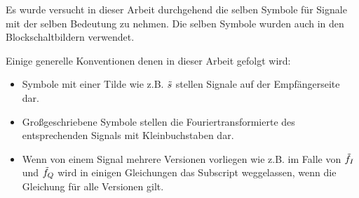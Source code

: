 Es wurde versucht in dieser Arbeit durchgehend die selben Symbole für Signale mit der selben Bedeutung zu nehmen. Die selben Symbole wurden auch in den Blockschaltbildern verwendet.

Einige generelle Konventionen denen in dieser Arbeit gefolgt wird: 
\begin{itemize}
\item Symbole mit einer Tilde wie z.B. $\tilde{s}$ stellen Signale auf der Empfängerseite dar. 
\item Großgeschriebene Symbole stellen die Fouriertransformierte des entsprechenden Signals mit Kleinbuchstaben dar.
\item Wenn von einem Signal mehrere Versionen vorliegen wie z.B. im Falle von $\tilde{f}_I$ und $\tilde{f}_Q$ wird in einigen Gleichungen das Subscript weggelassen, wenn die Gleichung für alle Versionen gilt.
\end{itemize}
